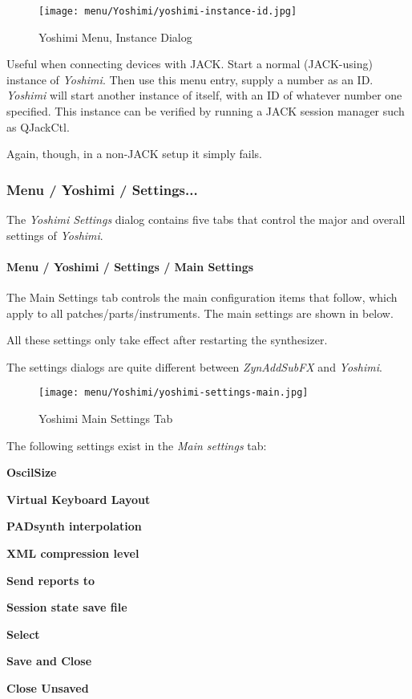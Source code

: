 \begin{figure}[H]
   \centering 
   \texttt{[image: menu/Yoshimi/yoshimi-instance-id.jpg]}
   \caption{Yoshimi Menu, Instance Dialog}
   \label{fig:yoshimi_instance_dialog}
\end{figure}

   Useful when connecting devices with JACK.
   Start a normal (JACK-using) instance of \textsl{Yoshimi}.
   Then use this menu entry, supply a number as an ID.
   \textsl{Yoshimi} will start another instance
   of itself, with an ID of whatever number one specified.
   This instance can be verified by running a JACK session manager such as
   QJackCtl.

   Again, though, in a non-JACK setup it simply fails.  

\subsubsection{Menu / Yoshimi / Settings...}
\label{subsubsec:menu_yoshimi_settings}

   The \textsl{Yoshimi Settings} dialog contains five tabs that control the
   major and overall settings of \textsl{Yoshimi}.
   
\paragraph{Menu / Yoshimi / Settings / Main Settings}
\label{paragraph:menu_yoshimi_settings_main_settings}

   The Main Settings tab controls the main configuration items that
   follow, which apply to all patches/parts/instruments.
   The main settings are shown in
    below.

   All these settings only take effect after restarting the synthesizer.

   The settings dialogs are quite different between \textsl{ZynAddSubFX} and
   \textsl{Yoshimi}.

\begin{figure}[H]
   \centering 
   \texttt{[image: menu/Yoshimi/yoshimi-settings-main.jpg]}
   \caption{Yoshimi Main Settings Tab}
   \label{fig:yoshimi_main_settings_dialog}
\end{figure}

   The following settings exist in the \textsl{Main settings} tab:

   \begin{enumber}
      \item \textbf{OscilSize}
      \item \textbf{Virtual Keyboard Layout}
      \item \textbf{PADsynth interpolation}
      \item \textbf{XML compression level}
      \item \textbf{Send reports to}
      \item \textbf{Session state save file}
      \item \textbf{Select}
      \item \textbf{Save and Close}
      \item \textbf{Close Unsaved}
   \end{enumber}

